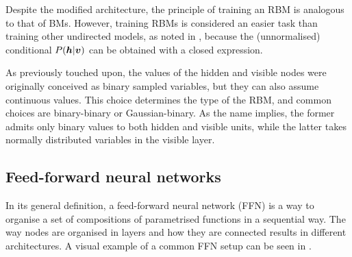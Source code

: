 Despite the modified architecture, the principle of training an RBM is analogous to that of BMs. However, training RBMs is considered an easier task than training other undirected models, as noted in \cite{dlbook}, because the (unnormalised) conditional $P(\boldsymbol{h} | \boldsymbol{v})$ can be obtained with a closed expression.

As previously touched upon, the values of the hidden and visible nodes were originally conceived as binary sampled variables, but they can also assume continuous values. This choice determines the type of the RBM, and common choices are binary-binary or Gaussian-binary. As the name implies, the former admits only binary values to both hidden and visible units, while the latter takes normally distributed variables in the visible layer.

\subsection{Feed-forward neural networks}

In its general definition, a feed-forward neural network (FFN) is a way to organise a set of compositions of parametrised functions in a sequential way.  The way nodes are organised in layers and how they are connected results in different architectures. A visual example of a common FFN setup can be seen in .

